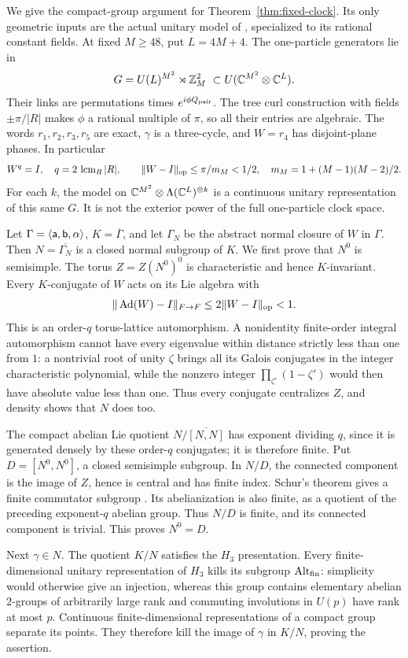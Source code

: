 We give the compact-group argument for Theorem~\ref{thm:fixed-clock}.
Its only geometric inputs are the actual unitary model of
\cite[Section~6]{DouglasMghirbiA}, specialized to its rational
constant fields. At fixed $M\geq48$, put $L=4M+4$.
The one-particle generators lie in
\[
 G=U(L)^{M^2}\rtimes\mathbb Z_M^2
       \ \subset U(\mathbb C^{M^2}\otimes\mathbb C^L).
\]
Their links are permutations times $e^{i\phi Q_{\rm pair}}$.
The tree curl construction with fields $\pm\pi/|R|$ makes $\phi$
a rational multiple of $\pi$, so all their entries are algebraic.
The words $r_1,r_2,r_3,r_5$ are exact, $\gamma$ is a three-cycle,
and $W=r_4$ has disjoint-plane phases. In particular
\[
 W^q=I,\quad q=2\,\operatorname{lcm}_R|R|,\qquad
 \|W-I\|_{\rm op}\leq\pi/m_M<1/2,\quad
 m_M=1+(M-1)(M-2)/2.
\]
For each $k$, the model on
$\mathbb C^{M^2}\otimes\Lambda(\mathbb C^L)^{\otimes k}$
is a continuous unitary representation of this same $G$.
It is not the exterior power of the full one-particle clock space.

Let $\Gamma=\langle\mathsf a,\mathsf b,\alpha\rangle$, $K=\overline\Gamma$,
and let $\Gamma_N$ be the abstract normal closure of $W$ in $\Gamma$.
Then $N=\overline{\Gamma_N}$ is a closed normal subgroup of $K$.
We first prove that $N^0$ is semisimple.
The torus $Z=Z(N^0)^0$ is characteristic and hence $K$-invariant.
Every $K$-conjugate of $W$ acts on its Lie algebra with
\[
 \|\operatorname{Ad}(W)-I\|_{F\to F}
       \leq2\|W-I\|_{\rm op}<1.
\]
This is an order-$q$ torus-lattice automorphism. A nonidentity
finite-order integral automorphism cannot have every eigenvalue
within distance strictly less than one from $1$: a nontrivial
root of unity $\zeta$ brings all its Galois conjugates in the
integer characteristic polynomial, while the nonzero integer
$\prod_{\zeta'}(1-\zeta')$ would then have absolute value less than
one. Thus every conjugate centralizes $Z$, and density shows that
$N$ does too.

The compact abelian Lie quotient $N/\overline{[N,N]}$ has exponent
dividing $q$, since it is generated densely by these order-$q$
conjugates; it is therefore finite. Put $D=[N^0,N^0]$, a closed
semisimple subgroup. In $N/D$, the connected component is the
image of $Z$, hence is central and has finite index.
Schur's theorem gives a finite commutator subgroup
\cite{Yadav2016}. Its abelianization is also finite, as a quotient
of the preceding exponent-$q$ abelian group. Thus $N/D$ is finite,
and its connected component is trivial. This proves $N^0=D$.

Next $\gamma\in N$. The quotient $K/N$ satisfies the $H_3$
presentation. Every finite-dimensional unitary representation
of $H_3$ kills its subgroup $\operatorname{Alt}_{\rm fin}$:
simplicity would otherwise give an injection, whereas this
group contains elementary abelian $2$-groups of arbitrarily
large rank and commuting involutions in $U(p)$ have rank at most
$p$. Continuous finite-dimensional representations of a compact
group separate its points. They therefore kill the image of
$\gamma$ in $K/N$, proving the assertion.

